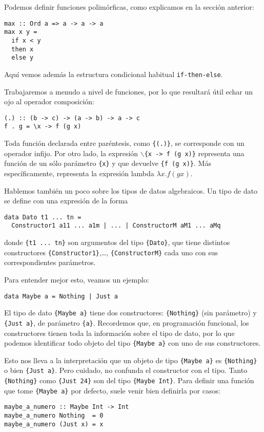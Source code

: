 \documentclass[12pt, twoside]{book}
\newcommand{\code}[1]{\Verb+{#1}+}
\begin{document}
Podemos definir funciones polimórficas, como explicamos en la sección anterior:
\begin{verbatim}
max :: Ord a => a -> a -> a 
max x y =
  if x < y
  then x 
  else y
\end{verbatim}
Aquí vemos además la estructura condicional habitual \texttt{if-then-else}.

Trabajaremos a menudo a nivel de funciones, por lo que resultará útil echar un ojo al operador composición:
\begin{verbatim}
(.) :: (b -> c) -> (a -> b) -> a -> c
f . g = \x -> f (g x)
\end{verbatim}
Toda función declarada entre paréntesis, como \code{(.)}, se corresponde con un operador infijo.
Por otro lado, la expresión $\backslash$\code{x -> f (g x)} representa una función de un sólo parámetro \code{x} y que devuelve \code{f (g x)}.
Más específicamente, representa la expresión lambda $\lambda x. f(g x)$.

Hablemos también un poco sobre los tipos de datos algebraicos.
Un tipo de dato se define con una expresión de la forma
\begin{verbatim}
data Dato t1 ... tn = 
  Constructor1 a11 ... a1m | ... | ConstructorM aM1 ... aMq
\end{verbatim}
donde \code{t1 ... tn} son argumentos del tipo \code{Dato}, que tiene distintos constructores \code{Constructor1},\dots, \code{ConstructorM} cada uno con sus correspondientes parámetros.

Para entender mejor esto, veamos un ejemplo:
\begin{verbatim}
data Maybe a = Nothing | Just a
\end{verbatim}
El tipo de dato \code{Maybe a} tiene dos constructores: \code{Nothing} (sin parámetro) y \code{Just a}, de parámetro \code{a}.
Recordemos que, en programación funcional, los constructores tienen toda la información sobre el tipo de dato, por lo que podemos identificar todo objeto del tipo \code{Maybe a} con uno de sus constructores.

Esto nos lleva a la interpretación que un objeto de tipo \code{Maybe a} es \code{Nothing} o bien \code{Just a}.
Pero cuidado, no confunda el constructor con el tipo.
Tanto \code{Nothing} como \code{Just 24} son del tipo \code{Maybe Int}.
Para definir una función que tome \code{Maybe a} por defecto, suele venir bien definirla por casos:
\begin{verbatim}
maybe_a_numero :: Maybe Int -> Int
maybe_a_numero Nothing  = 0
maybe_a_numero (Just x) = x
\end{verbatim}
\end{document}
